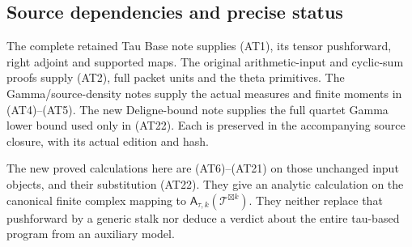 \subsection{Source dependencies and precise status}

The complete retained Tau Base note supplies (AT1), its tensor
pushforward, right adjoint and supported maps. The original
arithmetic-input and cyclic-sum proofs supply (AT2), full packet
units and the theta primitives. The Gamma/source-density notes
supply the actual measures and finite moments in (AT4)--(AT5).
The new Deligne-bound note supplies the full quartet Gamma
lower bound used only in (AT22). Each is preserved in the
accompanying source closure, with its actual edition and hash.

The new proved calculations here are (AT6)--(AT21) on those
unchanged input objects, and their substitution (AT22). They
give an analytic calculation on the canonical finite complex
mapping to $\mathsf A_{\tau,k}(\mathcal T^{\boxtimes k})$.
They neither replace that pushforward by a generic stalk nor
deduce a verdict about the entire tau-based program from an
auxiliary model.

\endgroup
